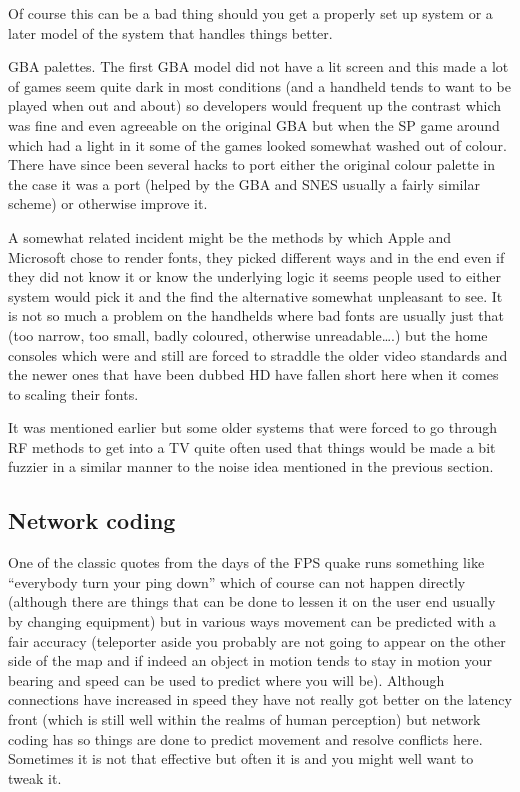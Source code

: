 \documentclass[
]{book}
\begin{document}
Of course this can be a bad thing should you get a properly set up system or a later model of the system that handles things better.

GBA palettes. The first GBA model did not have a lit screen and this made a lot of games seem quite dark in most conditions (and a handheld tends to want to be played when out and about) so developers would frequent up the contrast which was fine and even agreeable on the original GBA but when the SP game around which had a light in it some of the games looked somewhat washed out of colour. There have since been several hacks to port either the original colour palette in the case it was a port (helped by the GBA and SNES usually a fairly similar scheme) or otherwise improve it.

A somewhat related incident might be the methods by which Apple and Microsoft chose to render fonts, they picked different ways and in the end even if they did not know it or know the underlying logic it seems people used to either system would pick it and the find the alternative somewhat unpleasant to see. It is not so much a problem on the handhelds where bad fonts are usually just that (too narrow, too small, badly coloured, otherwise unreadable\ldots.) but the home consoles which were and still are forced to straddle the older video standards and the newer ones that have been dubbed HD have fallen short here when it comes to scaling their fonts.

It was mentioned earlier but some older systems that were forced to go through RF methods to get into a TV quite often used that things would be made a bit fuzzier in a similar manner to the noise idea mentioned in the previous section.

\hypertarget{network-coding}{%
\subsection{Network coding}\label{network-coding}}

One of the classic quotes from the days of the FPS quake runs something like ``everybody turn your ping down'' which of course can not happen directly (although there are things that can be done to lessen it on the user end usually by changing equipment) but in various ways movement can be predicted with a fair accuracy (teleporter aside you probably are not going to appear on the other side of the map and if indeed an object in motion tends to stay in motion your bearing and speed can be used to predict where you will be). Although connections have increased in speed they have not really got better on the latency front (which is still well within the realms of human perception) but network coding has so things are done to predict movement and resolve conflicts here. Sometimes it is not that effective but often it is and you might well want to tweak it.
\end{document}
